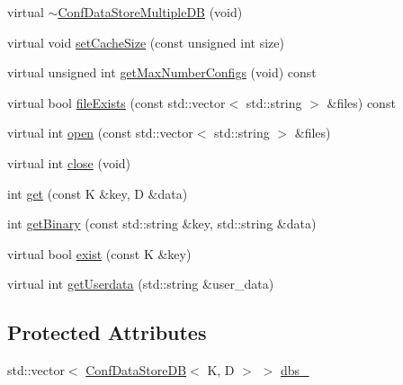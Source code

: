 \begin{DoxyCompactItemize}
\item 
virtual \mbox{\hyperlink{classFILEDB_1_1ConfDataStoreMultipleDB_a8025977163f25ad73764a794d0c89271}{$\sim$\+Conf\+Data\+Store\+Multiple\+DB}} (void)
\item 
virtual void \mbox{\hyperlink{classFILEDB_1_1ConfDataStoreMultipleDB_a37115269cf1f8f04c49ab888b040fa13}{set\+Cache\+Size}} (const unsigned int size)
\item 
virtual unsigned int \mbox{\hyperlink{classFILEDB_1_1ConfDataStoreMultipleDB_adb7a350dc85ad9c3830e98a0f03b68d7}{get\+Max\+Number\+Configs}} (void) const
\item 
virtual bool \mbox{\hyperlink{classFILEDB_1_1ConfDataStoreMultipleDB_a85c71818db3a3b0a5a67b4dabaed2ff7}{file\+Exists}} (const std\+::vector$<$ std\+::string $>$ \&files) const
\item 
virtual int \mbox{\hyperlink{classFILEDB_1_1ConfDataStoreMultipleDB_a3370c2f938d91e2352815aa45637b46d}{open}} (const std\+::vector$<$ std\+::string $>$ \&files)
\item 
virtual int \mbox{\hyperlink{classFILEDB_1_1ConfDataStoreMultipleDB_a6ab94d980290baa33292b7ec54bfe637}{close}} (void)
\item 
int \mbox{\hyperlink{classFILEDB_1_1ConfDataStoreMultipleDB_a15c985c05120d6076e890f0507ceade7}{get}} (const K \&key, D \&data)
\item 
int \mbox{\hyperlink{classFILEDB_1_1ConfDataStoreMultipleDB_a56fefab208c1b4abc3139afb38035a13}{get\+Binary}} (const std\+::string \&key, std\+::string \&data)
\item 
virtual bool \mbox{\hyperlink{classFILEDB_1_1ConfDataStoreMultipleDB_ad80312a9a4767f3b0b567932542d3ee7}{exist}} (const K \&key)
\item 
virtual int \mbox{\hyperlink{classFILEDB_1_1ConfDataStoreMultipleDB_aa3f101137804c73d44e2d87538acc014}{get\+Userdata}} (std\+::string \&user\+\_\+data)
\end{DoxyCompactItemize}
\subsection*{Protected Attributes}
\begin{DoxyCompactItemize}
\item 
std\+::vector$<$ \mbox{\hyperlink{classFILEDB_1_1ConfDataStoreDB}{Conf\+Data\+Store\+DB}}$<$ K, D $>$ $>$ \mbox{\hyperlink{classFILEDB_1_1ConfDataStoreMultipleDB_a9f562b5117bbeced1cbcae8498d6a884}{dbs\+\_\+}}
\end{DoxyCompactItemize}


